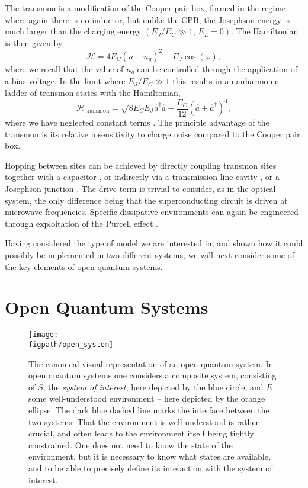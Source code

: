 The transmon is a modification of the Cooper pair box, formed in the regime where again there is no inductor, but unlike the CPB, the Josephson energy is much larger than the charging energy \((E_{J} / E_{C} \gg 1,\, E_{L} = 0)\). The Hamiltonian is then given by,
\begin{equation}
	\mathcal{H} = 4E_{C}(\hat{n} - n_{g})^{2} - E_{J}\cos(\varphi),
	\label{eq:mbq2-10}
\end{equation}
where we recall that the value of \(n_{g}\) can be controlled through the application of a bias voltage. In the limit where \(E_{J}/E_{C} \gg 1\) this results in an anharmonic ladder of transmon states with the Hamiltonian,
\begin{equation}
	\mathcal{H}_{\mathrm{transmon}} = \sqrt{8E_{C}E_{J}}\hat{a}^{\dagger}\hat{a} - \frac{E_{C}}{12}\left(\hat{a} + \hat{a}^{\dagger}\right)^{4},
	\label{eq:mbq2-11}
\end{equation}
where we have neglected constant terms \cite{Koch2007}. The principle advantage of the transmon is its relative insensitivity to charge noise compared to the Cooper pair box.

Hopping between sites can be achieved by directly coupling transmon sites together with a capacitor \cite{Wendin2007}, or indirectly via a transmission line cavity \cite{Majer2007}, or a Josephson junction \cite{Chen2014}. The drive term is trivial to consider, as in the optical system, the only difference being that the superconducting circuit is driven at microwave frequencies. Specific dissipative environments can again be engineered through exploitation of the Purcell effect \cite{Purcell1946,Fox_Purcell}.

Having considered the type of model we are interested in, and shown how it could possibly be implemented in two different systems, we will next consider some of the key elements of open quantum systems.

\section{\label{sec:OQS}Open Quantum Systems}

\begin{figure}[ht!]
\centering
\texttt{[image: \\figpath/open\_system]}
\caption{The canonical visual representation of an open quantum system. In open quantum systems one considers a composite system, consisting of \(S\), the \emph{system of interest}, here depicted by the blue circle, and \(E\) some well-understood environment -- here depicted by the orange ellipse. The dark blue dashed line marks the interface between the two systems. That the environment is well understood is rather crucial, and often leads to the environment itself being tightly constrained. One does not need to know the state of the environment, but it is necessary to know what states are available, and to be able to precisely define its interaction with the system of interest.}
\label{fig:oqs1-1}
\end{figure}

